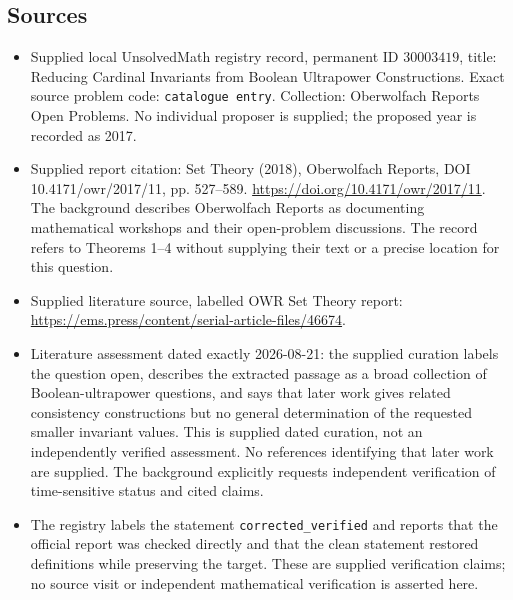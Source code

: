\documentclass[11pt]{article}
\begin{document}
\subsection{Sources}
\begin{itemize}
\item Supplied local UnsolvedMath registry record, permanent ID \(30003419\), title: Reducing Cardinal Invariants from Boolean Ultrapower Constructions. Exact source problem code: \texttt{catalogue entry}. Collection: Oberwolfach Reports Open Problems. No individual proposer is supplied; the proposed year is recorded as 2017.
\item Supplied report citation: Set Theory (2018), Oberwolfach Reports, DOI 10.4171/owr/2017/11, pp. 527--589. \url{https://doi.org/10.4171/owr/2017/11}. The background describes Oberwolfach Reports as documenting mathematical workshops and their open-problem discussions. The record refers to Theorems 1--4 without supplying their text or a precise location for this question.
\item Supplied literature source, labelled OWR Set Theory report: \url{https://ems.press/content/serial-article-files/46674}.
\item Literature assessment dated exactly 2026-08-21: the supplied curation labels the question open, describes the extracted passage as a broad collection of Boolean-ultrapower questions, and says that later work gives related consistency constructions but no general determination of the requested smaller invariant values. This is supplied dated curation, not an independently verified assessment. No references identifying that later work are supplied. The background explicitly requests independent verification of time-sensitive status and cited claims.
\item The registry labels the statement \texttt{corrected\_verified} and reports that the official report was checked directly and that the clean statement restored definitions while preserving the target. These are supplied verification claims; no source visit or independent mathematical verification is asserted here.
\end{itemize}
\end{document}
